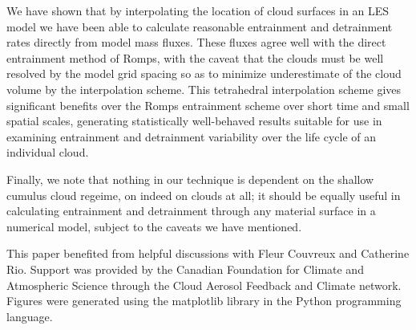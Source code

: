 \documentclass[12pt]{article}
\begin{document}
We have shown that by interpolating the location of cloud surfaces in an LES
model we have been able to calculate reasonable entrainment and detrainment 
rates directly from model mass fluxes.  These fluxes agree well with the 
direct entrainment method of Romps, with the caveat that the clouds must be 
well resolved by the model grid spacing so as to minimize underestimate of the 
cloud volume by the interpolation scheme.  This tetrahedral interpolation 
scheme gives significant benefits over the Romps entrainment scheme over short 
time and small spatial scales, generating statistically well-behaved results 
suitable for use in examining entrainment and detrainment variability over the 
life cycle of an individual cloud.

Finally, we note that nothing in our technique is dependent on the shallow 
cumulus cloud regeime, on indeed on clouds at all; it should be equally useful
in calculating entrainment and detrainment through any material surface in a 
numerical model, subject to the caveats we have mentioned.



\begin{acknowledgment}
This paper benefited from helpful discussions with Fleur Couvreux and Catherine 
Rio.  Support was provided by the Canadian Foundation for Climate and 
Atmospheric Science through the Cloud Aerosol Feedback and Climate network.
Figures were generated using the matplotlib library in the Python programming 
language.
\end{acknowledgment}


\end{document}
